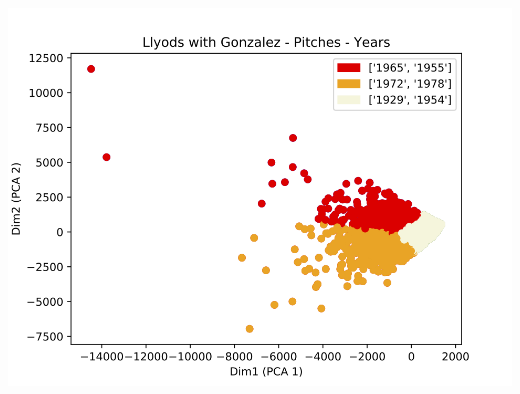 \documentclass[11pt]{article}
\begin{document}
\begin{center}
\includegraphics[scale=0.3]{assests/fig4.png}
\end{center}
\end{document}
